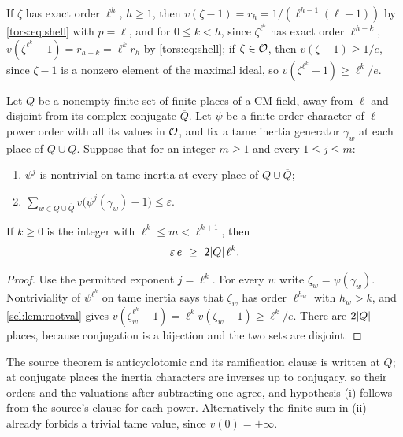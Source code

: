 \begin{remark}\label{sel:lem:rootval}
If $\zeta$ has exact order $\ell^h$, $h\ge1$, then
$v(\zeta-1)=r_h=1/(\ell^{h-1}(\ell-1))$ by \eqref{tors:eq:shell} with $p=\ell$, and for
$0\le k<h$, since $\zeta^{\ell^k}$ has exact order $\ell^{h-k}$,
$v(\zeta^{\ell^k}-1)=r_{h-k}=\ell^kr_h$ by \eqref{tors:eq:shell}; if $\zeta\in\mathcal{O}$, then
$v(\zeta-1)\ge1/e$, since $\zeta-1$ is a nonzero element of the maximal ideal,
so $v(\zeta^{\ell^k}-1)\ge\ell^k/e$.
\end{remark}

\begin{theorem}\label{sel:thm:rambudget}
Let $Q$ be a nonempty finite set of finite places of a CM field, away from
$\ell$ and disjoint from its complex conjugate $\overline Q$. Let $\psi$ be
a finite-order character of $\ell$-power order with all its values in
$\mathcal{O}$, and fix a tame inertia generator $\gamma_w$ at each place of
$Q\cup\overline Q$. Suppose that for an integer $m\ge1$ and every
$1\le j\le m$:
\begin{enumerate}[label=\textup{(\roman*)}]
\item $\psi^j$ is nontrivial on tame inertia at every place of
$Q\cup\overline Q$;
\item $\sum_{w\in Q\cup\overline Q}v\bigl(\psi^j(\gamma_w)-1\bigr)\le\varepsilon$.
\end{enumerate}
If $k\ge0$ is the integer with $\ell^k\le m<\ell^{k+1}$, then
\begin{equation}\label{sel:eq:rambudget}
 \varepsilon\,e\ \ge\ 2\lvert Q\rvert\,\ell^k .
\end{equation}
\end{theorem}

\begin{proof}
Use the permitted exponent $j=\ell^k$. For every $w$ write
$\zeta_w=\psi(\gamma_w)$. Nontriviality of $\psi^{\ell^k}$ on tame inertia
says that $\zeta_w$ has order $\ell^{h_w}$ with $h_w>k$, and
\cref{sel:lem:rootval} gives
$v(\zeta_w^{\ell^k}-1)=\ell^kv(\zeta_w-1)\ge\ell^k/e$. There are $2\lvert Q\rvert$
places, because conjugation is a bijection and the two sets are disjoint.
\end{proof}

The source theorem is anticyclotomic and its ramification clause is written
at $Q$; at conjugate places the inertia characters are inverses up to
conjugacy, so their orders and the valuations after subtracting one agree,
and hypothesis (i) follows from the source's clause for each power.
Alternatively the finite sum in (ii) already forbids a trivial tame value,
since $v(0)=+\infty$.


